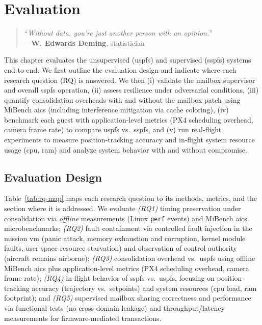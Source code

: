 %
\chapter{Evaluation}
\label{cha:evaluation}
%
\begin{quote}
\begin{flushright}
``\emph{Without data, you're just another person with an opinion.}'' \\
\textbf{-- W. Edwards Deming}, statistician
\end{flushright}
\end{quote}

This chapter evaluates the unsupervised (\gls{uspfs}) and supervised
(\gls{sspfs}) systems end-to-end. We first outline the evaluation design and
indicate where each research question (RQ) is answered. We then (i) validate the
mailbox supervisor and overall \gls{sspfs} operation, (ii) assess resilience
under adversarial conditions, (iii) quantify consolidation overheads with and
without the mailbox patch using MiBench \gls{aics} (including interference
mitigation via cache coloring), (iv) benchmark each guest with application-level
metrics (PX4 scheduling overhead, camera frame rate) to compare \gls{uspfs} vs.\
\gls{sspfs}, and (v) run real-flight experiments to measure position-tracking
accuracy and in-flight system resource usage (\gls{cpu}, \gls{ram}) and analyze
system behavior with and without compromise.

\section{Evaluation Design}
\label{sec:eval-design}
Table~\ref{tab:rq-map} maps each research question to its methods, metrics, and the section where it is addressed.
%
We evaluate \emph{(RQ1)} timing preservation under consolidation via \emph{offline} measurements (Linux \texttt{perf} events) and MiBench \gls{aics} microbenchmarks; 
\emph{(RQ2)} fault containment via controlled fault injection in the mission
\gls{vm} (panic attack, memory exhaustion and corruption, kernel module faults, user-space resource starvation) and observation of control authority (aircraft remains airborne);
\emph{(RQ3)} consolidation overhead vs.\ \gls{uspfs} using offline MiBench
\gls{aics} plus application-level metrics (PX4 scheduling overhead, camera frame
rate);
\emph{(RQ4)} in-flight behavior of \gls{sspfs} vs.\ \gls{uspfs}, focusing on
position-tracking accuracy (trajectory vs.\ setpoints) and system resources
(\gls{cpu} load, \gls{ram} footprint); and 
\emph{(RQ5)} supervised mailbox sharing correctness and performance via
functional tests (no cross-domain leakage) and throughput/latency measurements
for firmware-mediated transactions.

